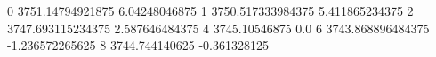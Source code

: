 0 3751.14794921875 6.04248046875
1 3750.517333984375 5.411865234375
2 3747.693115234375 2.587646484375
4 3745.10546875 0.0
6 3743.868896484375 -1.236572265625
8 3744.744140625 -0.361328125
